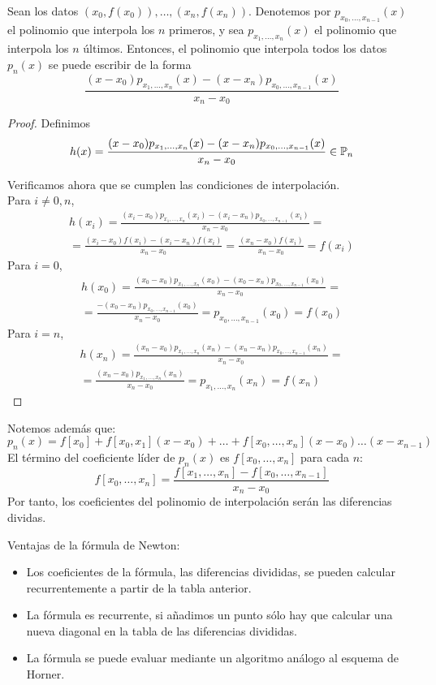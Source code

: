 \begin{lema}[Aitken] Sean los datos $(x_0,f(x_0)),\dots,(x_n,f(x_n))$. Denotemos por $p_{x_0,\dots,x_{n-1}}(x)$ el polinomio que interpola los $n$ primeros, y sea $p_{x_1,\dots,x_n}(x)$ el polinomio que interpola los $n$ últimos. Entonces, el polinomio que interpola todos los datos $p_n(x)$ se puede escribir de la forma
\begin{equation*}
    \frac{(x-x_0)p_{x_1,\dots,x_n}(x) - (x-x_n)p_{x_0,\dots,x_{n-1}}(x)}{x_n-x_0}
\end{equation*}
\end{lema}
\begin{proof}
    Definimos $$h(x)=\frac{(x-x_0)p_{x_1,\dots,x_n}(x) - (x-x_n)p_{x_0,\dots,x_{n-1}}(x)}{x_n-x_0}\in \mathbb{P}_n$$

    Verificamos ahora que se cumplen las condiciones de interpolación.\\
    Para $i\neq 0,n$,
    \begin{multline*}
        h(x_i)=\frac{(x_i-x_0)p_{x_1,\dots,x_n}(x_i) - (x_i-x_n)p_{x_0,\dots,x_{n-1}}(x_i)}{x_n-x_0} =\\=
        \frac{(x_i-x_0)f(x_i)-(x_i-x_n)f(x_i)}{x_n-x_0} = \frac{(x_n-x_0)f(x_i)}{x_n-x_0} = f(x_i)
    \end{multline*}
    Para $i=0$,
    \begin{multline*}
        h(x_0)=\frac{(x_0-x_0)p_{x_1,\dots,x_n}(x_0) - (x_0-x_n)p_{x_0,\dots,x_{n-1}}(x_0)}{x_n-x_0} =\\=
        \frac{- (x_0-x_n)p_{x_0,\dots,x_{n-1}}(x_0)}{x_n-x_0} = p_{x_0,\dots,x_{n-1}}(x_0) = f(x_0)
    \end{multline*}
    Para $i=n$,
    \begin{multline*}
        h(x_n)=\frac{(x_n-x_0)p_{x_1,\dots,x_n}(x_n) - (x_n-x_n)p_{x_0,\dots,x_{n-1}}(x_n)}{x_n-x_0} =\\=
        \frac{(x_n-x_0)p_{x_1,\dots,x_n}(x_n)}{x_n-x_0} = p_{x_1,\dots,x_n}(x_n) = f(x_n)
    \end{multline*}
\end{proof}

Notemos además que:
$$p_n(x)=f[x_0] + f[x_0,x_1](x-x_0) + \ldots + f[x_0, \ldots, x_n](x-x_0)\ldots (x-x_{n-1})$$
El término del coeficiente líder de $p_n(x)$ es $f[x_0, \ldots, x_n]$ para cada $n$:
$$f[x_0, \ldots, x_n] = \dfrac{f[x_1, \ldots, x_n]-f[x_0, \ldots, x_{n-1}]}{x_n-x_0}$$
Por tanto, los coeficientes del polinomio de interpolación serán las diferencias dividas.

\bigskip \noindent
Ventajas de la fórmula de Newton:
\begin{itemize}
    \item Los coeficientes de la fórmula, las diferencias divididas, se pueden calcular recurrentemente
          a partir de la tabla anterior.
    \item La fórmula es recurrente, si añadimos un punto sólo hay que calcular una nueva diagonal
          en la tabla de las diferencias divididas.
    \item La fórmula se puede evaluar mediante un algoritmo análogo al esquema de Horner.
\end{itemize}



